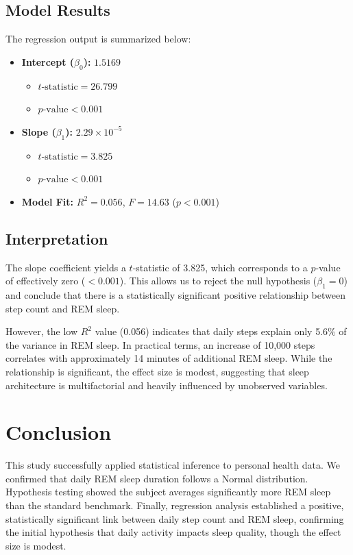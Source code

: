 \documentclass[conference]{IEEEtran}
\begin{document}
\subsection{Model Results}
The regression output is summarized below:
\begin{itemize}
    \item \textbf{Intercept ($\beta_0$):} $1.5169$
    \begin{itemize}
        \item $t\text{-statistic} = 26.799$
        \item $p\text{-value} < 0.001$
    \end{itemize}
    \item \textbf{Slope ($\beta_1$):} $2.29 \times 10^{-5}$
    \begin{itemize}
        \item $t\text{-statistic} = 3.825$
        \item $p\text{-value} < 0.001$
    \end{itemize}
    \item \textbf{Model Fit:} $R^2 = 0.056$, $F = 14.63$ ($p < 0.001$)
\end{itemize}

\subsection{Interpretation}
The slope coefficient yields a $t$-statistic of 3.825, which corresponds to a $p$-value of effectively zero ($< 0.001$). This allows us to reject the null hypothesis ($\beta_1 = 0$) and conclude that there is a statistically significant positive relationship between step count and REM sleep.

However, the low $R^2$ value (0.056) indicates that daily steps explain only 5.6\% of the variance in REM sleep. In practical terms, an increase of 10,000 steps correlates with approximately 14 minutes of additional REM sleep. While the relationship is significant, the effect size is modest, suggesting that sleep architecture is multifactorial and heavily influenced by unobserved variables. 

\section{Conclusion}
This study successfully applied statistical inference to personal health data. We confirmed that daily REM sleep duration follows a Normal distribution. Hypothesis testing showed the subject averages significantly more REM sleep than the standard benchmark. Finally, regression analysis established a positive, statistically significant link between daily step count and REM sleep, confirming the initial hypothesis that daily activity impacts sleep quality, though the effect size is modest.
\end{document}

